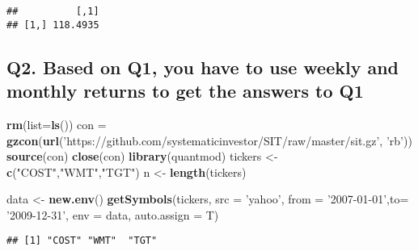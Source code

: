 \documentclass[]{article}
\newenvironment{Shaded}{\begin{snugshade}}{\end{snugshade}}
\newcommand{\DataTypeTok}[1]{\textcolor[rgb]{0.13,0.29,0.53}{#1}}
\newcommand{\DecValTok}[1]{\textcolor[rgb]{0.00,0.00,0.81}{#1}}
\newcommand{\KeywordTok}[1]{\textcolor[rgb]{0.13,0.29,0.53}{\textbf{#1}}}
\newcommand{\NormalTok}[1]{#1}
\newcommand{\OperatorTok}[1]{\textcolor[rgb]{0.81,0.36,0.00}{\textbf{#1}}}
\newcommand{\StringTok}[1]{\textcolor[rgb]{0.31,0.60,0.02}{#1}}
\begin{document}
\begin{Shaded}
\end{Shaded}

\begin{verbatim}
##          [,1]
## [1,] 118.4935
\end{verbatim}

\hypertarget{q2.-based-on-q1-you-have-to-use-weekly-and-monthly-returns-to-get-the-answers-to-q1}{%
\subsection{Q2. Based on Q1, you have to use weekly and monthly returns
to get the answers to
Q1}\label{q2.-based-on-q1-you-have-to-use-weekly-and-monthly-returns-to-get-the-answers-to-q1}}

\begin{Shaded}
\begin{Highlighting}[]
\KeywordTok{rm}\NormalTok{(}\DataTypeTok{list=}\KeywordTok{ls}\NormalTok{())}
\NormalTok{con =}\StringTok{ }\KeywordTok{gzcon}\NormalTok{(}\KeywordTok{url}\NormalTok{(}\StringTok{'https://github.com/systematicinvestor/SIT/raw/master/sit.gz'}\NormalTok{, }\StringTok{'rb'}\NormalTok{))}
\KeywordTok{source}\NormalTok{(con)}
\KeywordTok{close}\NormalTok{(con)}
\KeywordTok{library}\NormalTok{(quantmod)}
\NormalTok{tickers <-}\StringTok{ }\KeywordTok{c}\NormalTok{(}\StringTok{"COST"}\NormalTok{,}\StringTok{"WMT"}\NormalTok{,}\StringTok{"TGT"}\NormalTok{)}
\NormalTok{n <-}\StringTok{ }\KeywordTok{length}\NormalTok{(tickers)}

\NormalTok{data <-}\StringTok{ }\KeywordTok{new.env}\NormalTok{()}
\KeywordTok{getSymbols}\NormalTok{(tickers, }\DataTypeTok{src =} \StringTok{'yahoo'}\NormalTok{, }\DataTypeTok{from =} \StringTok{'2007-01-01'}\NormalTok{,}\DataTypeTok{to=} \StringTok{'2009-12-31'}\NormalTok{, }\DataTypeTok{env =}\NormalTok{ data, }\DataTypeTok{auto.assign =}\NormalTok{ T)}
\end{Highlighting}
\end{Shaded}

\begin{verbatim}
## [1] "COST" "WMT"  "TGT"
\end{verbatim}
\end{document}
